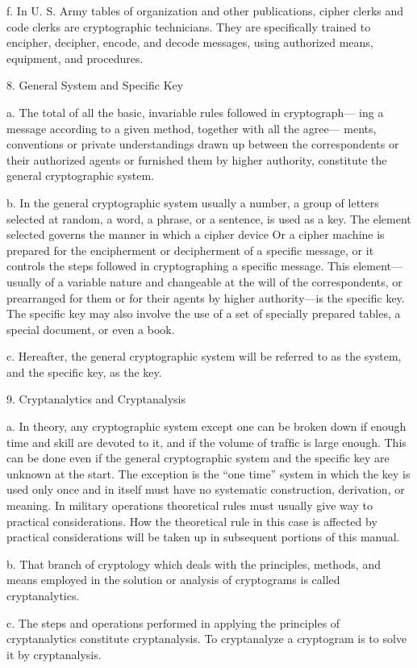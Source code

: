 f. In U. S. Army tables of organization and other publications, cipher
clerks and code clerks are cryptographic technicians. They are speciﬁcally
trained to encipher, decipher, encode, and decode messages, using
authorized means, equipment, and procedures.

8. General System and Speciﬁc Key

a. The total of all the basic, invariable rules followed in cryptograph—
ing a message according to a given method, together with all the agree—
ments, conventions or private understandings drawn up between the
correspondents or their authorized agents or furnished them by higher
authority, constitute the general cryptographic system.

b. In the general cryptographic system usually a number, a group of
letters selected at random, a word, a phrase, or a sentence, is used as a
key. The element selected governs the manner in which a cipher device
Or a cipher machine is prepared for the encipherment or decipherment
of a speciﬁc message, or it controls the steps followed in cryptographing
a specific message. This element—usually of a variable nature and
changeable at the will of the correspondents, or prearranged for them or
for their agents by higher authority—is the speciﬁc key. The speciﬁc key
may also involve the use of a set of specially prepared tables, a special
document, or even a book.

c. Hereafter, the general cryptographic system will be referred to as
the system, and the speciﬁc key, as the key.

9. Cryptanalytics and Cryptanalysis

a. In theory, any cryptographic system except one can be broken down
if enough time and skill are devoted to it, and if the volume of trafﬁc is
large enough. This can be done even if the general cryptographic system
and the speciﬁc key are unknown at the start. The exception is the “one
time” system in which the key is used only once and in itself must have
no systematic construction, derivation, or meaning. In military operations
theoretical rules must usually give way to practical considerations. How
the theoretical rule in this case is affected by practical considerations
will be taken up in subsequent portions of this manual.

b. That branch of cryptology which deals with the principles, methods,
and means employed in the solution or analysis of cryptograms is called
cryptanalytics.

c. The steps and operations performed in applying the principles of
cryptanalytics constitute cryptanalysis. To cryptanalyze a cryptogram is
to solve it by cryptanalysis.

